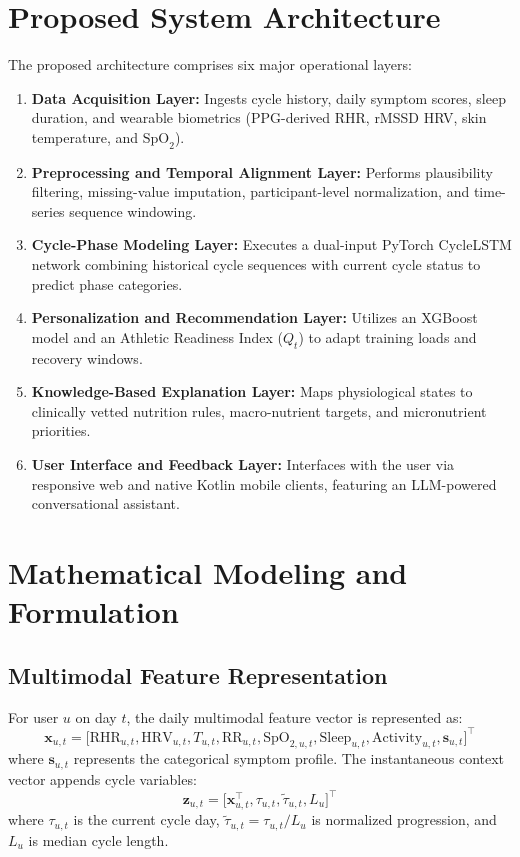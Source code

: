 \documentclass[conference]{IEEEtran}
\begin{document}
\section{Proposed System Architecture}
The proposed architecture comprises six major operational layers:
\begin{enumerate}
    \item \textbf{Data Acquisition Layer:} Ingests cycle history, daily symptom scores, sleep duration, and wearable biometrics (PPG-derived RHR, rMSSD HRV, skin temperature, and $\text{SpO}_2$).
    \item \textbf{Preprocessing and Temporal Alignment Layer:} Performs plausibility filtering, missing-value imputation, participant-level normalization, and time-series sequence windowing.
    \item \textbf{Cycle-Phase Modeling Layer:} Executes a dual-input PyTorch CycleLSTM network combining historical cycle sequences with current cycle status to predict phase categories.
    \item \textbf{Personalization and Recommendation Layer:} Utilizes an XGBoost model and an Athletic Readiness Index ($Q_t$) to adapt training loads and recovery windows.
    \item \textbf{Knowledge-Based Explanation Layer:} Maps physiological states to clinically vetted nutrition rules, macro-nutrient targets, and micronutrient priorities.
    \item \textbf{User Interface and Feedback Layer:} Interfaces with the user via responsive web and native Kotlin mobile clients, featuring an LLM-powered conversational assistant.
\end{enumerate}

\section{Mathematical Modeling and Formulation}

\subsection{Multimodal Feature Representation}
For user $u$ on day $t$, the daily multimodal feature vector is represented as:
\begin{equation}
\mathbf{x}_{u,t} = \big[ \text{RHR}_{u,t}, \text{HRV}_{u,t}, T_{u,t}, \text{RR}_{u,t}, \text{SpO}_{2,u,t}, \text{Sleep}_{u,t}, \text{Activity}_{u,t}, \mathbf{s}_{u,t} \big]^\top
\end{equation}
where $\mathbf{s}_{u,t}$ represents the categorical symptom profile. The instantaneous context vector appends cycle variables:
\begin{equation}
\mathbf{z}_{u,t} = \big[ \mathbf{x}_{u,t}^\top, \tau_{u,t}, \tilde{\tau}_{u,t}, L_u \big]^\top
\end{equation}
where $\tau_{u,t}$ is the current cycle day, $\tilde{\tau}_{u,t} = \tau_{u,t} / L_u$ is normalized progression, and $L_u$ is median cycle length.
\end{document}
